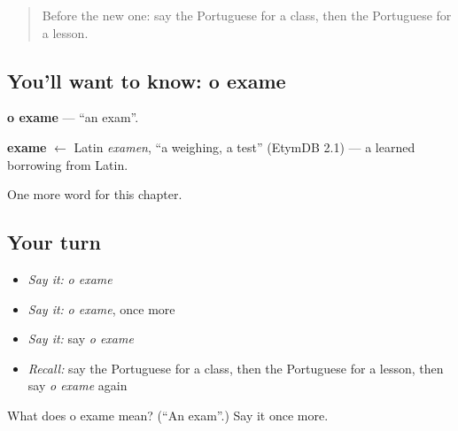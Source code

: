 \label{lesson:PT-C112-exame}



\begin{quote}
Before the new one: say the Portuguese for a class, then the Portuguese for a lesson.
\end{quote}

\subsection*{You'll want to know: o exame}
\textbf{o exame} — \textquotedblleft{}an exam\textquotedblright{}.

\begin{cousinweb}
\textbf{exame} $\leftarrow$ Latin \emph{examen}, \textquotedblleft{}a weighing, a test\textquotedblright{} (EtymDB 2.1) — a learned borrowing from Latin.
\end{cousinweb}

\begin{grammarlens}[title={What you've built}]
One more word for this chapter.
\end{grammarlens}

\subsection*{Your turn}
\begin{itemize}
\raggedright
  \item \emph{Say it:} \emph{o exame}
  \item \emph{Say it:} \emph{o exame}, once more
  \item \emph{Say it:} say \emph{o exame}
  \item \emph{Recall:} say the Portuguese for a class, then the Portuguese for a lesson, then say \emph{o exame} again
\end{itemize}

\begin{tcolorbox}[breakable,colback=teal!4,colframe=teal!35!black,title={Before you move on}]
What does o exame mean? (\textquotedblleft{}An exam\textquotedblright{}.) Say it once more.
\end{tcolorbox}
